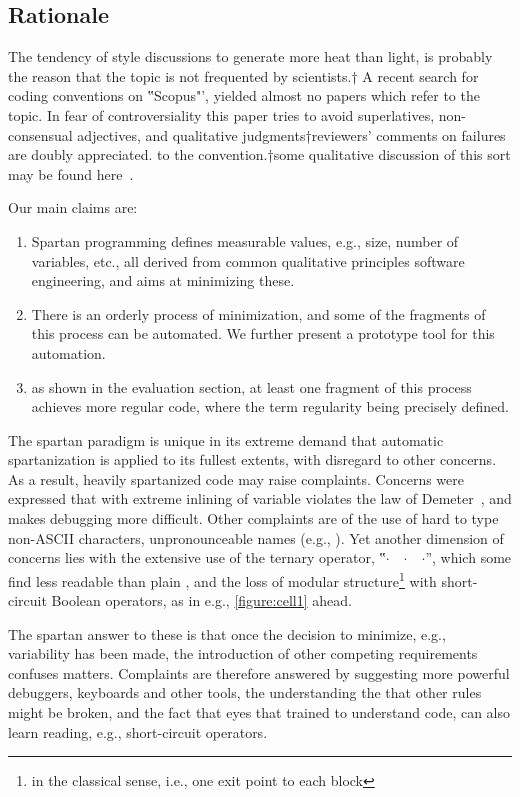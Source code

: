 \subsection{Rationale}

The tendency of style discussions to generate more heat than light, is probably
the reason that the topic is not frequented by scientists.†{%
  A recent search for coding conventions on ‟Scopus"', yielded almost no papers which
refer to the topic.} In fear of controversiality this paper tries to avoid
superlatives, non-consensual adjectives, and qualitative judgments†{reviewers'
comments on failures are doubly appreciated.} to the
convention.†{some qualitative discussion of this
  sort may be found here~\cite{Gil:2010}.}

 Our main claims are:
\begin{enumerate}
    \item Spartan programming defines measurable values, e.g., size, number of
      variables, etc., all derived from common qualitative principles
        software engineering, and aims at minimizing these.
    \item There is an orderly process of minimization,
      and some of the fragments of this process can be automated.
     We further present a prototype tool for this automation.
    \item as shown in the evaluation section, at least one fragment of this
      process achieves more regular code, where the term regularity being
      precisely defined.
\end{enumerate}

 The spartan paradigm is unique in its extreme demand that automatic
  spartanization is applied to its fullest extents, with disregard
  to other concerns.
As a result, heavily spartanized code may raise complaints.
Concerns were expressed that with extreme inlining of variable
violates the law of Demeter~\cite{Lieberherr:96}, and makes debugging more difficult.
Other complaints are of the use of hard to type non-ASCII characters,
  unpronounceable names (e.g., ).
Yet another dimension of concerns lies with the extensive
  use of the ternary operator, ‟$·$~~$·$~\cc{:}~$·$”, which some find
  less readable than plain , and the loss of modular
  structure\footnote{in the classical sense, i.e., one exit point to each
  block} with short-circuit Boolean operators, as in e.g., \cref{figure:cell1}
  ahead.

The spartan answer to these is that once the decision to minimize, e.g.,
  variability has been made, the introduction of other competing requirements 
  confuses matters.
Complaints are therefore answered by suggesting more powerful
  debuggers, keyboards and other tools, the understanding the
  that other rules might be broken, and the fact that eyes that 
  trained to understand code, can also learn reading, e.g., short-circuit
  operators.

